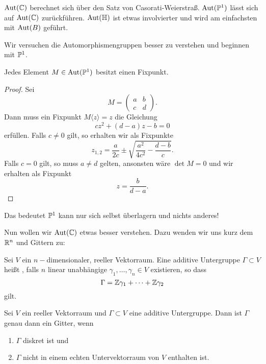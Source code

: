$\Aut(\C)$ berechnet sich über den Satz von
Casorati-Weierstraß. $\Aut(\P^1)$ lässt sich auf $\Aut(\C)$
zurückführen. $\Aut(\h)$ ist etwas involvierter und wird am
einfachsten mit $\Aut(B)$ geführt.

Wir versuchen die Automorphismengruppen besser zu verstehen und
beginnen mit $\P^1$.

\begin{prop}
  Jedes Element $M \in \Aut(\P^1)$ besitzt einen Fixpunkt.
\end{prop}

\begin{proof}
  Sei
  \[
  M =
  \begin{pmatrix}
    a & b\\
    c & d
  \end{pmatrix}.
  \]
  Dann muss ein Fixpunkt $M\langle z \rangle = z$ die Gleichung
  \[
  cz^2 + (d-a)z - b = 0
  \]
  erfüllen. 
  Falls $c \neq 0$ gilt, so erhalten wir als Fixpunkte
  \[
  z_{1,2} = \frac{a}{2c} \pm \sqrt{\frac{a^2}{4 c^2} - \frac{d-b}{c}}.
  \]
  Falls $c = 0$ gilt, so muss $a \neq d$ gelten, ansonsten wäre
  $\det M = 0$ und wir erhalten als Fixpunkt
  \[
  z = \frac{b}{d-a}.
  \]
\end{proof}

Das bedeutet $\P^1$ kann nur sich selbst überlagern und nichts
anderes!

Nun wollen wir $\Aut(\C)$ etwas besser verstehen. Dazu wenden wir uns
kurz dem $\R^n$ und Gittern zu:

\begin{defin}
  \label{defin:gitter}
  Sei $V$ ein $n-$dimensionaler, reeller Vektorraum. Eine additive
  Untergruppe $\Gamma \subset V$ heißt , falls $n$ linear
  unabhängige $\gamma_1, \dots, \gamma_n \in V$ existieren, so dass
  \[
  \Gamma = \Z \gamma_1 + \dots + \Z \gamma_2
  \]
  gilt.
\end{defin}


\begin{lemma}
  \label{lemma:gitter}
  Sei $V$ ein reeller Vektorraum und $\Gamma \subset V$ eine additive
  Untergruppe. Dann ist $\Gamma$ genau dann ein Gitter, wenn
  \begin{enumerate}
  \item $\Gamma$ diskret ist und
  \item $\Gamma$ nicht in einem echten Untervektorraum von $V$
    enthalten ist.
  \end{enumerate}
\end{lemma}

